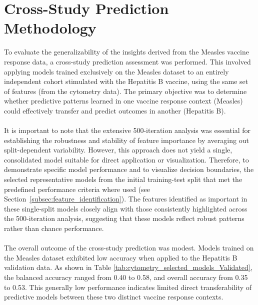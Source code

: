 \documentclass[12pt,a4paper]{report}
\begin{document}
\section{Cross-Study Prediction Methodology}
\noindent
To evaluate the generalizability of the insights derived from the Measles vaccine response data, a cross-study prediction assessment was performed. This involved applying models trained exclusively on the Measles dataset to an entirely independent cohort stimulated with the Hepatitis B vaccine, using the same set of features (from the cytometry data). The primary objective was to determine whether predictive patterns learned in one vaccine response context (Measles) could effectively transfer and predict outcomes in another (Hepatitis B).\\
\\
It is important to note that the extensive 500-iteration analysis was essential for establishing the robustness and stability of feature importance by averaging out split-dependent variability. However, this approach does not yield a single, consolidated model suitable for direct application or visualization. Therefore, to demonstrate specific model performance and to visualize decision boundaries, the selected representative models from the initial training-test split that met the predefined performance criteria where used (see Section~\ref{subsec:feature_identification}). The features identified as important in these single-split models closely align with those consistently highlighted across the 500-iteration analysis, suggesting that these models reflect robust patterns rather than chance performance.\\
\\
The overall outcome of the cross-study prediction was modest. Models trained on the Measles dataset exhibited low accuracy when applied to the Hepatitis B validation data. As shown in Table \ref{tab:cytometry_selected_models_Validated}, the balanced accuracy ranged from 0.40 to 0.58, and overall accuracy from 0.35 to 0.53. This generally low performance indicates limited direct transferability of predictive models between these two distinct vaccine response contexts.\\
\end{document}
